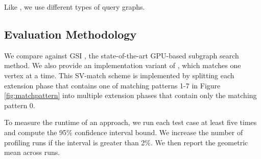  Like , we use  different types of query graphs. 

\subsection{Evaluation Methodology}
 We compare \SystemName against GSI \cite{zeng2020gsi}, the state-of-the-art GPU-based subgraph search
method. We also provide an implementation variant of \SystemName, which matches one vertex at a time. This SV-match scheme is implemented
by splitting each extension phase that contains one of matching patterns 1-7 in Figure \ref {fig:matchpattern} into multiple extension
phases that contain only the matching pattern 0.

 To measure the runtime of an approach, we run each test case at least five times and compute the 95\%
confidence interval bound. We increase the number of profiling runs if the interval is greater than 2\%. We then report the geometric mean
across runs.
